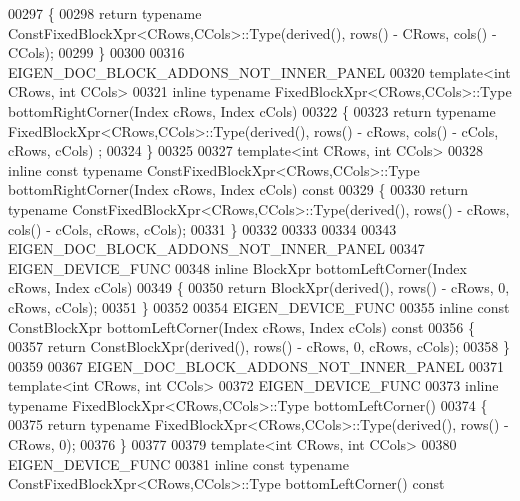 \begin{DoxyCode}
00297 \textcolor{keyword}{}\{
00298   \textcolor{keywordflow}{return} \textcolor{keyword}{typename} ConstFixedBlockXpr<CRows,CCols>::Type(derived(), rows() - CRows, cols() - CCols);
00299 \}
00300 
00316 EIGEN\_DOC\_BLOCK\_ADDONS\_NOT\_INNER\_PANEL
00320 \textcolor{keyword}{template}<\textcolor{keywordtype}{int} CRows, \textcolor{keywordtype}{int} CCols>
00321 \textcolor{keyword}{inline} \textcolor{keyword}{typename} FixedBlockXpr<CRows,CCols>::Type bottomRightCorner(Index cRows, Index cCols)
00322 \{
00323   \textcolor{keywordflow}{return} \textcolor{keyword}{typename} FixedBlockXpr<CRows,CCols>::Type(derived(), rows() - cRows, cols() - cCols, cRows, cCols)
      ;
00324 \}
00325 
00327 \textcolor{keyword}{template}<\textcolor{keywordtype}{int} CRows, \textcolor{keywordtype}{int} CCols>
00328 \textcolor{keyword}{inline} \textcolor{keyword}{const} \textcolor{keyword}{typename} ConstFixedBlockXpr<CRows,CCols>::Type bottomRightCorner(Index cRows, Index cCols)\textcolor{keyword}{
       const}
00329 \textcolor{keyword}{}\{
00330   \textcolor{keywordflow}{return} \textcolor{keyword}{typename} ConstFixedBlockXpr<CRows,CCols>::Type(derived(), rows() - cRows, cols() - cCols, cRows, 
      cCols);
00331 \}
00332 
00333 
00334 
00343 EIGEN\_DOC\_BLOCK\_ADDONS\_NOT\_INNER\_PANEL
00347 EIGEN\_DEVICE\_FUNC
00348 \textcolor{keyword}{inline} BlockXpr bottomLeftCorner(Index cRows, Index cCols)
00349 \{
00350   \textcolor{keywordflow}{return} BlockXpr(derived(), rows() - cRows, 0, cRows, cCols);
00351 \}
00352 
00354 EIGEN\_DEVICE\_FUNC
00355 \textcolor{keyword}{inline} \textcolor{keyword}{const} ConstBlockXpr bottomLeftCorner(Index cRows, Index cCols)\textcolor{keyword}{ const}
00356 \textcolor{keyword}{}\{
00357   \textcolor{keywordflow}{return} ConstBlockXpr(derived(), rows() - cRows, 0, cRows, cCols);
00358 \}
00359 
00367 EIGEN\_DOC\_BLOCK\_ADDONS\_NOT\_INNER\_PANEL
00371 \textcolor{keyword}{template}<\textcolor{keywordtype}{int} CRows, \textcolor{keywordtype}{int} CCols>
00372 EIGEN\_DEVICE\_FUNC
00373 \textcolor{keyword}{inline} \textcolor{keyword}{typename} FixedBlockXpr<CRows,CCols>::Type bottomLeftCorner()
00374 \{
00375   \textcolor{keywordflow}{return} \textcolor{keyword}{typename} FixedBlockXpr<CRows,CCols>::Type(derived(), rows() - CRows, 0);
00376 \}
00377 
00379 \textcolor{keyword}{template}<\textcolor{keywordtype}{int} CRows, \textcolor{keywordtype}{int} CCols>
00380 EIGEN\_DEVICE\_FUNC
00381 \textcolor{keyword}{inline} \textcolor{keyword}{const} \textcolor{keyword}{typename} ConstFixedBlockXpr<CRows,CCols>::Type bottomLeftCorner()\textcolor{keyword}{ const}

\end{DoxyCode}
